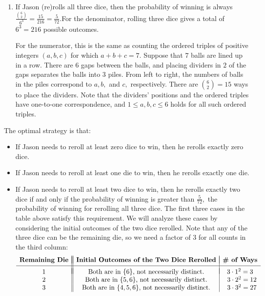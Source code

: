 \begin{enumerate}
\begin{enumerate}
        \item If Jason (re)rolls all three dice, then the probability of winning is always $\frac{\binom62}{6^3}=\frac{15}{216}=\frac{5}{72}.$For the denominator, rolling three dice gives a total of $6^3=216$ possible outcomes. 

 For the numerator, this is the same as counting the ordered triples of positive integers $(a,b,c)$ for which $a+b+c=7.$ Suppose that $7$ balls are lined up in a row. There are $6$ gaps between the balls, and placing dividers in $2$ of the gaps separates the balls into $3$ piles. From left to right, the numbers of balls in the piles correspond to $a,b,$ and $c,$ respectively. There are $\binom62=15$ ways to place the dividers. Note that the dividers' positions and the ordered triples have one-to-one correspondence, and $1\leq a,b,c\leq6$ holds for all such ordered triples. 

 

 
            \end{enumerate}
            The optimal strategy is that:

 
            \begin{itemize} 
        \item If Jason needs to reroll at least zero dice to win, then he rerolls exactly zero dice.

        \item If Jason needs to reroll at least one die to win, then he rerolls exactly one die.

        \item If Jason needs to reroll at least two dice to win, then he rerolls exactly two dice if and only if the probability of winning is greater than $\frac{5}{72},$ the probability of winning for rerolling all three dice.  The first three cases in the table above satisfy this requirement. We will analyze these cases by considering the initial outcomes of the two dice rerolled. Note that any of the three dice can be the remaining die, so we need a factor of $3$ for all counts in the third column:
 \[\begin{array}{c||c|c}  & & \\ [-2.5ex]  \textbf{Remaining Die} & \textbf{Initial Outcomes of the Two Dice Rerolled} & \textbf{\# of Ways} \\ [0.5ex]  \hline  & & \\ [-2ex]  1 & \text{Both are in }\{6\}\text{, not necessarily distinct.} & 3\cdot1^2=3 \\  2 & \text{Both are in }\{5,6\}\text{, not necessarily distinct.} & \hspace{2mm}3\cdot2^2=12 \\  3 & \text{Both are in }\{4,5,6\}\text{, not necessarily distinct.} & \hspace{2mm}3\cdot3^2=27 \end{array}\]


\end{itemize}
\end{enumerate}
